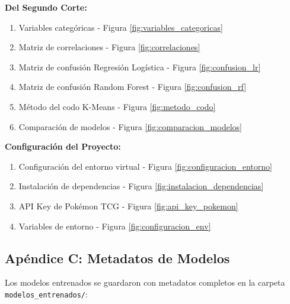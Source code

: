 \documentclass[12pt,letterpaper]{article}
\begin{document}
\textbf{Del Segundo Corte:}
\begin{enumerate}
    \item Variables categóricas - Figura \ref{fig:variables_categoricas}
    \item Matriz de correlaciones - Figura \ref{fig:correlaciones}
    \item Matriz de confusión Regresión Logística - Figura \ref{fig:confusion_lr}
    \item Matriz de confusión Random Forest - Figura \ref{fig:confusion_rf}
    \item Método del codo K-Means - Figura \ref{fig:metodo_codo}
    \item Comparación de modelos - Figura \ref{fig:comparacion_modelos}
\end{enumerate}

\textbf{Configuración del Proyecto:}
\begin{enumerate}
    \item Configuración del entorno virtual - Figura \ref{fig:configuracion_entorno}
    \item Instalación de dependencias - Figura \ref{fig:instalacion_dependencias}
    \item API Key de Pokémon TCG - Figura \ref{fig:api_key_pokemon}
    \item Variables de entorno - Figura \ref{fig:configuracion_env}
\end{enumerate}

\subsection{Apéndice C: Metadatos de Modelos}

Los modelos entrenados se guardaron con metadatos completos en la carpeta \texttt{modelos\_entrenados/}:
\end{document}
